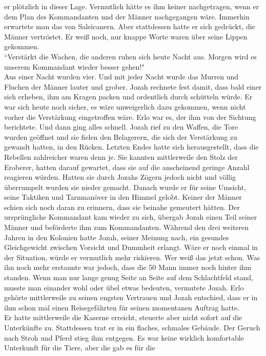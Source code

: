 er plötzlich in dieser Lage. Vermutlich hätte es ihm keiner nachgetragen, wenn er dem Plan des 
Kommandanten und der Männer nachgegangen wäre. Immerhin erwartete man das von Saleicanern. Aber 
stattdessen hatte er sich gedrückt, die Männer vertröstet. Er weiß noch, nur knappe Worte waren über 
seine Lippen gekommen. \\  ``Verstärkt die Wachen, die anderen ruhen sich heute Nacht aus. Morgen 
wird es unserem Kommandant wieder besser gehen!"\\
Aus einer Nacht wurden vier. Und mit jeder Nacht wurde das Murren und Fluchen der Männer lauter und 
grober. Jozah rechnete fest damit, dass bald einer sich erheben, ihm am Kragen packen und 
ordentlich durch schütteln würde. Er war sich heute noch sicher, es wäre unweigerlich dazu 
gekommen, wenn nicht vorher die Verstärkung eingetroffen wäre. Erlo war es, der ihm von der 
Sichtung berichtete. Und dann ging alles schnell. Jozah rief zu den Waffen, die Tore wurden geöffnet 
und sie fielen den Belagerern, die sich der Verstärkung zu gewandt hatten, in den Rücken. 
Letzten Endes hatte sich herausgestellt, dass die Rebellen zahlreicher waren denn je. Sie kannten 
mittlerweile den Stolz der Eroberer, hatten darauf gewartet, dass sie auf die anscheinend geringe 
Anzahl reagieren würden. Hatten sie durch Jozahs Zögern jedoch nicht und völlig überrumpelt wurden 
sie nieder gemacht. Danach wurde er für seine Umsicht, seine Taktiken und Tarnmanöver in den Himmel 
gelobt. Keiner der Männer schien sich noch daran zu erinnern, dass sie beinahe gemeutert hätten. Der 
ursprüngliche Kommandant kam wieder zu sich, übergab Jozah einen Teil seiner Männer und beförderte 
ihm zum Kommandanten. Während den drei weiteren Jahren in den Kolonien hatte Jozah, seiner Meinung 
nach, ein gesundes Gleichgewicht zwischen Vorsicht und Dummheit erlangt. Wäre er noch einmal in der 
Situation, würde er vermutlich mehr riskieren. Wer weiß das jetzt schon. Was ihn noch mehr erstaunte 
war jedoch, dass die 50 Mann immer noch hinter ihm standen. Wenn man nur lange genug Seite an Seite 
auf dem Schlachtfeld stand, musste man einander wohl oder übel etwas bedeuten, vermutete Jozah. 
Erlo gehörte mittlerweile zu seinen engsten Vertrauen und Jozah entschied, dass er in ihm schon mal 
einen Reisegefährten für seinen momentanen Auftrag hatte. \\
Er hatte mittlerweile die Kaserne erreicht, steuerte aber nicht sofort auf die Unterkünfte zu. 
Stattdessen trat er in ein flaches, schmales Gebäude. Der Geruch nach Stroh und Pferd stieg ihm 
entgegen. Es war keine wirklich komfortable Unterkunft für die Tiere, aber die gab es für die 
